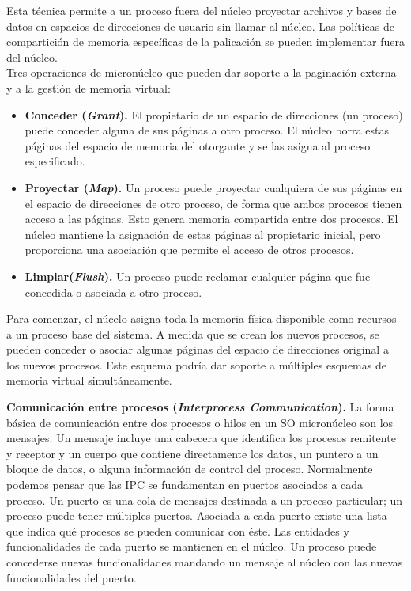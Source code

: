 \documentclass{article}
\begin{document}
				Esta técnica permite a un proceso fuera del núcleo proyectar archivos y bases de datos en espacios de direcciones de usuario sin llamar al núcleo. Las políticas de compartición de memoria específicas de la palicación se pueden implementar fuera del núcleo. \\
				
				Tres operaciones de micronúcleo que pueden dar soporte a la paginación externa y a la gestión de memoria virtual:
				
				\begin{itemize}
				\item \textbf{Conceder (\textit{Grant}).} El propietario de un espacio de direcciones (un proceso) puede conceder alguna de sus páginas a otro proceso. El núcleo borra estas páginas del espacio de memoria del otorgante y se las asigna al proceso especificado.
				\item \textbf{Proyectar (\textit{Map}).} Un proceso puede proyectar cualquiera de sus páginas en el espacio de direcciones de otro proceso, de forma que ambos procesos tienen acceso a las páginas. Esto genera memoria compartida entre dos procesos. El núcleo mantiene la asignación de estas páginas al propietario inicial, pero proporciona una asociación que permite el acceso de otros procesos.
				\item \textbf{Limpiar(\textit{Flush}).} Un proceso puede reclamar cualquier página que fue concedida o asociada a otro proceso.
				\end{itemize}
				
				Para comenzar, el núcelo asigna toda la memoria física disponible como recursos a un proceso base del sistema. A medida que se crean los nuevos procesos, se pueden conceder o asociar algunas páginas del espacio de direcciones original a los nuevos procesos. Este esquema podría dar soporte a múltiples esquemas de memoria virtual simultáneamente.
				
				\textbf{Comunicación entre procesos (\textit{Interprocess Communication}).} La forma básica de comunicación entre dos procesos o hilos en un SO micronúcleo son los mensajes. Un mensaje incluye una cabecera que identifica los procesos remitente y receptor y un cuerpo que contiene directamente los datos, un puntero a un bloque de datos, o alguna información de control del proceso. Normalmente podemos pensar que las IPC se fundamentan en puertos asociados a cada proceso. Un puerto es una cola de mensajes destinada a un proceso particular; un proceso puede tener múltiples puertos. Asociada a cada puerto existe una lista que indica qué procesos se pueden comunicar con éste. Las entidades y funcionalidades de cada puerto se mantienen en el núcleo. Un proceso puede concederse nuevas funcionalidades mandando un mensaje al núcleo con las nuevas funcionalidades del puerto. \\
				
\end{document}
